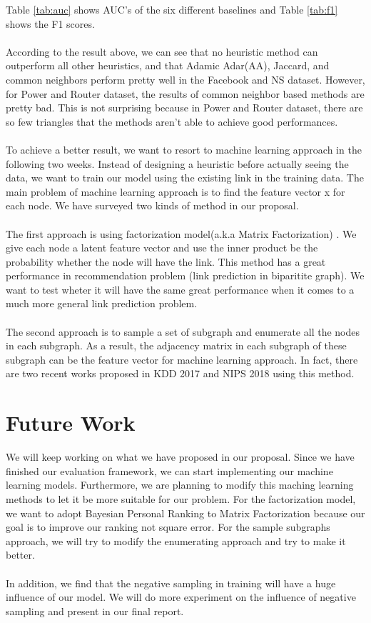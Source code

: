 \documentclass[12pt]{article}
\begin{document}
	Table \ref{tab:auc} shows AUC's of the six different baselines and Table \ref{tab:f1} shows the F1 scores.
	\\
	\\
	According to the result above, we can see that no heuristic method can outperform all other heuristics, and that Adamic Adar(AA), Jaccard, and common neighbors perform pretty well in the Facebook and NS dataset. However, for Power and Router dataset, the results of common neighbor based methods are pretty bad. This is not surprising because in Power and Router dataset, there are so few triangles that the methods aren't able to achieve good performances. 
	\\
	\\
	To achieve a better result, we want to resort to machine learning approach in the following two weeks. Instead of designing a heuristic before actually seeing the data, we want to train our model using the existing link in the training data. The main problem of machine learning approach is to find the feature vector x for each node. We have surveyed two kinds of method in our proposal. 
	\\
	\\
	The first approach is using factorization model(a.k.a Matrix Factorization) \cite{mf}. We give each node a latent feature vector and use the inner product be the probability whether the node will have the link. This method has a great performance in recommendation problem (link prediction in biparitite graph). We want to test wheter it will have the same great performance when it comes to a much more general link prediction problem. 
	\\
	\\
	The second approach is to sample a set of subgraph and enumerate all the nodes in each subgraph. As a result, the adjacency matrix in each subgraph of these subgraph can be the feature vector for machine learning approach. In fact, there are two recent works proposed in KDD 2017 \cite{lp2017} and NIPS 2018 \cite{lp2018} using this method. 
	
	\section{Future Work}
	We will keep working on what we have proposed in our proposal. Since we have finished our evaluation framework, we can start implementing our machine learning models. Furthermore, we are planning to modify this maching learning methods to let it be more suitable for our problem. For the factorization model, we want to adopt Bayesian Personal Ranking \cite{bpr} to Matrix Factorization because our goal is to improve our ranking not square error. For the sample subgraphs approach, we will try to modify the enumerating approach and try to make it better.
	\\
	\\
	In addition, we find that the negative sampling in training will have a huge influence of our model. We will do more experiment on the influence of negative sampling and present in our final report.

	
	
	
	
	
	
	
\end{document}
